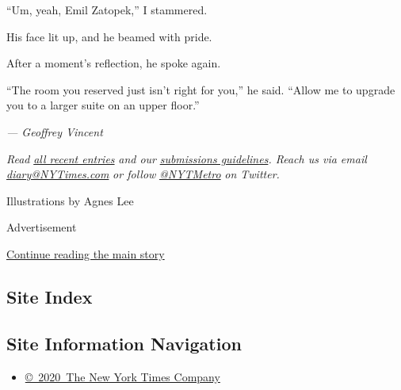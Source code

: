 ``Um, yeah, Emil Zatopek,'' I stammered.

His face lit up, and he beamed with pride.

After a moment's reflection, he spoke again.

``The room you reserved just isn't right for you,'' he said. ``Allow me
to upgrade you to a larger suite on an upper floor.''

\emph{--- Geoffrey Vincent}

\emph{Read}
\href{http://www.nytimes3xbfgragh.onion/column/metropolitan-diary}{\emph{all
recent entries}} \emph{and our}
\href{http://www.nytimes3xbfgragh.onion/2015/10/21/nyregion/how-to-submit-to-metropolitan-diary.html}{\emph{submissions
guidelines}}\emph{. Reach us via email}
\href{mailto:diary@NYTimes.com}{\emph{diary@NYTimes.com}} \emph{or
follow} \href{https://twitter.com/\#\%21/nytmetro}{\emph{@NYTMetro}}
\emph{on Twitter.}

Illustrations by Agnes Lee

Advertisement

\protect\hyperlink{after-bottom}{Continue reading the main story}

\hypertarget{site-index}{%
\subsection{Site Index}\label{site-index}}

\hypertarget{site-information-navigation}{%
\subsection{Site Information
Navigation}\label{site-information-navigation}}

\begin{itemize}
\tightlist
\item
  \href{https://help.nytimes3xbfgragh.onion/hc/en-us/articles/115014792127-Copyright-notice}{©~2020~The
  New York Times Company}
\end{itemize}

